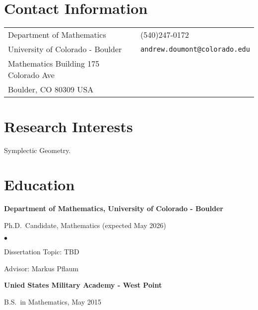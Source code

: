 \documentclass[margin,line,pifont,palatino,courier]{res}
\newenvironment{list1}{
  \begin{list}{\ding{113}}{%
      \setlength{\itemsep}{0in}
      \setlength{\parsep}{0in} \setlength{\parskip}{0in}
      \setlength{\topsep}{0in} \setlength{\partopsep}{0in}
      \setlength{\leftmargin}{0.17in}}}{\end{list}}
\newenvironment{list2}{
  \begin{list}{$\bullet$}{%
      \setlength{\itemsep}{0in}
      \setlength{\parsep}{0in} \setlength{\parskip}{0in}
      \setlength{\topsep}{0in} \setlength{\partopsep}{0in}
      \setlength{\leftmargin}{0.2in}}}{\end{list}}
\begin{document}

\begin{resume}

\section{\sc Contact Information}

\vspace{.05in}
\begin{tabular}{@{}p{2.75in}p{2in}}
Department of Mathematics  & (540)247-0172 \\
University of Colorado - Boulder                        & \verb+andrew.doumont@colorado.edu+\\
Mathematics Building 175 Colorado Ave                 & \\
Boulder, CO 80309 USA              & \\
\end{tabular}

\section{\sc Research Interests}
Symplectic Geometry.

\section{\sc Education}

{\bf Department of Mathematics, University of Colorado - Boulder}\\
\vspace*{-.1in}
\begin{list1}
\item[] Ph.D.~Candidate, Mathematics (expected May 2026)

\begin{list2}
\vspace*{.05in}
\item Dissertation Topic:  TBD
\item Advisor: Markus Pflaum
\end{list2}
\end{list1}

{\bf Unied States Military Academy - West Point}\\
\vspace*{-.1in}
\begin{list1}
\item[] B.S.~in Mathematics, May 2015


\end{list1}
\end{resume}
\end{document}
